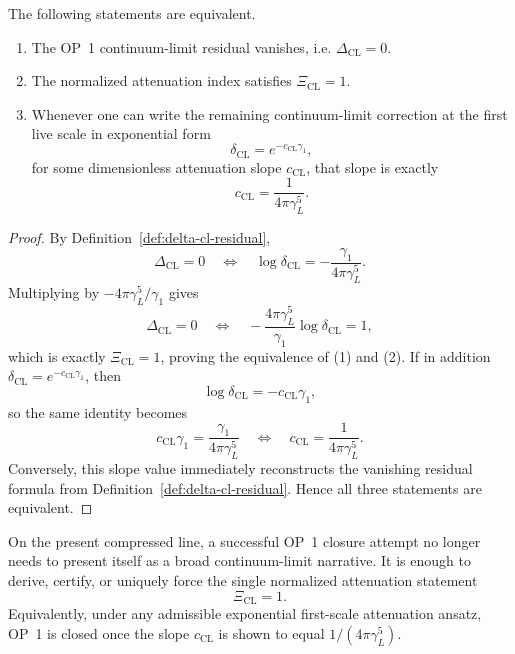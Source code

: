 \begin{proposition}
\label{prop:op1-slope-certificate}
The following statements are equivalent.
\begin{enumerate}[leftmargin=2em]
  \item The OP~1 continuum-limit residual vanishes, i.e. \(\Delta_{\mathrm{CL}}=0\).
  \item The normalized attenuation index satisfies \(\Xi_{\mathrm{CL}}=1\).
  \item Whenever one can write the remaining continuum-limit correction at the first live scale in exponential form
  \[
    \delta_{\mathrm{CL}} = e^{-c_{\mathrm{CL}}\gamma_1},
  \]
  for some dimensionless attenuation slope \(c_{\mathrm{CL}}\), that slope is exactly
  \[
    c_{\mathrm{CL}} = \frac{1}{4\pi\gamma_L^5}.
  \]
\end{enumerate}
\end{proposition}

\begin{proof}
By Definition~\ref{def:delta-cl-residual},
\[
  \Delta_{\mathrm{CL}}=0
  \quad\Longleftrightarrow\quad
  \log \delta_{\mathrm{CL}} = -\frac{\gamma_1}{4\pi\gamma_L^5}.
\]
Multiplying by \(-4\pi\gamma_L^5/\gamma_1\) gives
\[
  \Delta_{\mathrm{CL}}=0
  \quad\Longleftrightarrow\quad
  -\frac{4\pi\gamma_L^5}{\gamma_1}\log \delta_{\mathrm{CL}} = 1,
\]
which is exactly \(\Xi_{\mathrm{CL}}=1\), proving the equivalence of (1) and (2). If in addition \(\delta_{\mathrm{CL}} = e^{-c_{\mathrm{CL}}\gamma_1}\), then
\[
  \log \delta_{\mathrm{CL}} = -c_{\mathrm{CL}}\gamma_1,
\]
so the same identity becomes
\[
  c_{\mathrm{CL}}\gamma_1 = \frac{\gamma_1}{4\pi\gamma_L^5}
  \quad\Longleftrightarrow\quad
  c_{\mathrm{CL}} = \frac{1}{4\pi\gamma_L^5}.
\]
Conversely, this slope value immediately reconstructs the vanishing residual formula from Definition~\ref{def:delta-cl-residual}. Hence all three statements are equivalent.
\end{proof}

\begin{corollary}
\label{cor:op1-r02-target}
On the present compressed line, a successful OP~1 closure attempt no longer needs to present itself as a broad continuum-limit narrative. It is enough to derive, certify, or uniquely force the single normalized attenuation statement
\[
  \Xi_{\mathrm{CL}}=1.
\]
Equivalently, under any admissible exponential first-scale attenuation ansatz, OP~1 is closed once the slope \(c_{\mathrm{CL}}\) is shown to equal \(1/(4\pi\gamma_L^5)\).
\end{corollary}

